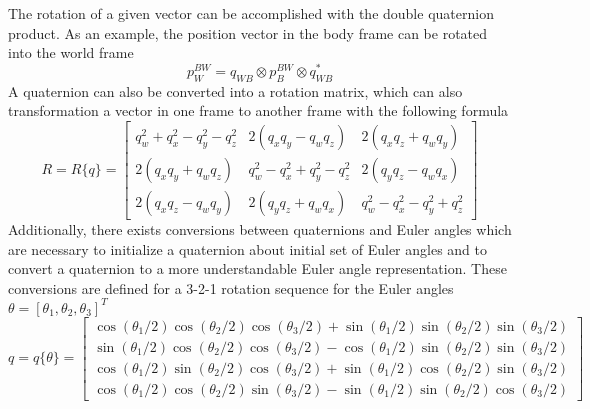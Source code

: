 The rotation of a given vector can be accomplished with the double quaternion product. As an example, the position vector in the body frame can be rotated into the world frame
\begin{equation}
        p_W^{BW} = q_{WB} \otimes p_B^{BW} \otimes q_{WB}^*
    \label{eq: quaterion rotation of p}
\end{equation}
A quaternion can also be converted into a rotation matrix, which can also transformation a vector in one frame to another frame with the following formula \cite{Quaternion_Kinematics_for_the_Error-state_EKF}
\begin{equation}
    R = R\{q\} = \left[\begin{array}{ccc}q_w^2+q_x^2-q_y^2-q_z^2 & 2\left(q_x q_y-q_w q_z\right) & 2\left(q_x q_z+q_w q_y\right) \\ 2\left(q_x q_y+q_w q_z\right) & q_w^2-q_x^2+q_y^2-q_z^2 & 2\left(q_y q_z-q_w q_x\right) \\ 2\left(q_x q_z-q_w q_y\right) & 2\left(q_y q_z+q_w q_x\right) & q_w^2-q_x^2-q_y^2+q_z^2\end{array}\right]
    \label{eq: q to R}
\end{equation}
Additionally, there exists conversions between quaternions and Euler angles which are necessary to initialize a quaternion about initial set of  Euler angles and to convert a quaternion to a more understandable Euler angle representation. These conversions are defined for a 3-2-1 rotation sequence for the Euler angles $\theta = [\theta_1, \theta_2, \theta_3]^T$ \cite{EulerQ} \cite{blanco2021tutorial}
\begin{equation}
    q = q\{\theta\} = \left[\begin{array}{c}\cos (\theta_1 / 2) \cos (\theta_2 / 2) \cos (\theta_3 / 2)+\sin (\theta_1 / 2) \sin (\theta_2 / 2) \sin (\theta_3 / 2) \\ \sin (\theta_1 / 2) \cos (\theta_2 / 2) \cos (\theta_3 / 2)-\cos (\theta_1 / 2) \sin (\theta_2 / 2) \sin (\theta_3 / 2) \\ \cos (\theta_1 / 2) \sin (\theta_2 / 2) \cos (\theta_3 / 2)+\sin (\theta_1 / 2) \cos (\theta_2 / 2) \sin (\theta_3 / 2) \\ \cos (\theta_1 / 2) \cos (\theta_2 / 2) \sin (\theta_3 / 2)-\sin (\theta_1 / 2) \sin (\theta_2 / 2) \cos (\theta_3 / 2)\end{array}\right]
    \label{eq: Euler to quaternion}
\end{equation}

